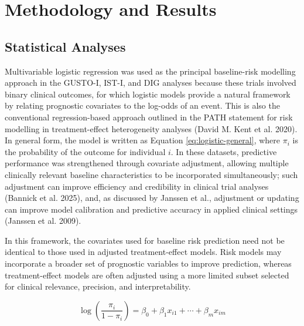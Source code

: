 \documentclass{article}
\begin{document}
\section{Methodology and Results}\label{methodology-and-results}

\subsection{Statistical Analyses}\label{statistical-analyses}

Multivariable logistic regression was used as the principal
baseline-risk modelling approach in the GUSTO-I, IST-I, and DIG analyses
because these trials involved binary clinical outcomes, for which
logistic models provide a natural framework by relating prognostic
covariates to the log-odds of an event. This is also the conventional
regression-based approach outlined in the PATH statement for risk
modelling in treatment-effect heterogeneity analyses (David M. Kent et
al. 2020). In general form, the model is written as Equation
\ref{eq:logistic-general}, where \(\pi_i\) is the probability of the
outcome for individual \(i\). In these datasets, predictive performance
was strengthened through covariate adjustment, allowing multiple
clinically relevant baseline characteristics to be incorporated
simultaneously; such adjustment can improve efficiency and credibility
in clinical trial analyses (Bannick et al. 2025), and, as discussed by
Janssen et al., adjustment or updating can improve model calibration and
predictive accuracy in applied clinical settings (Janssen et al. 2009).

In this framework, the covariates used for baseline risk prediction need
not be identical to those used in adjusted treatment-effect models. Risk
models may incorporate a broader set of prognostic variables to improve
prediction, whereas treatment-effect models are often adjusted using a
more limited subset selected for clinical relevance, precision, and
interpretability.

\begin{equation}
\log\left(\frac{\pi_i}{1-\pi_i}\right) = \beta_0 + \beta_1 x_{i1} + \cdots + \beta_m x_{im}
\label{eq:logistic-general}
\end{equation}
\end{document}
